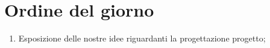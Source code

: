 \documentclass[../verbale-2017-02-07.tex]{subfiles}
\begin{document}
	
\section{Ordine del giorno}
	\begin{enumerate}
		\item Esposizione delle nostre idee riguardanti la progettazione progetto;
	\end{enumerate}	
\end{document}
